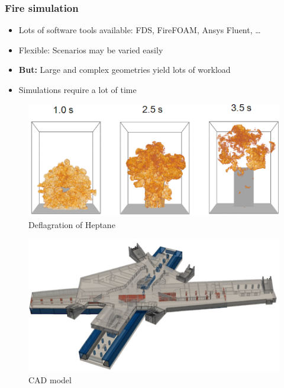 \begin{frame}
\frametitle{Fire simulation}

\begin{itemize}
\item Lots of software tools available: FDS, FireFOAM, Ansys Fluent, \ldots
\item Flexible: Scenarios may be varied easily
\end{itemize}

\vfill{}

\begin{itemize}
\item \textbf{But:} Large and complex geometries yield lots of workload
\item Simulations require a lot of time
\end{itemize}

\vfill{}

\begin{minipage}[b]{.49\textwidth}
  \begin{figure}
  \includegraphics[width=\textwidth]{figures/deflagration_heptane_500kg_450px.png}
  \caption{Deflagration of Heptane}
  \end{figure}
\end{minipage}
\hfill{}
\begin{minipage}[b]{.49\textwidth}
  \begin{figure}
  \includegraphics[width=\textwidth]{figures/metro_cad_450px.png}
  \caption{CAD model}
  \end{figure}
\end{minipage}
\end{frame}





